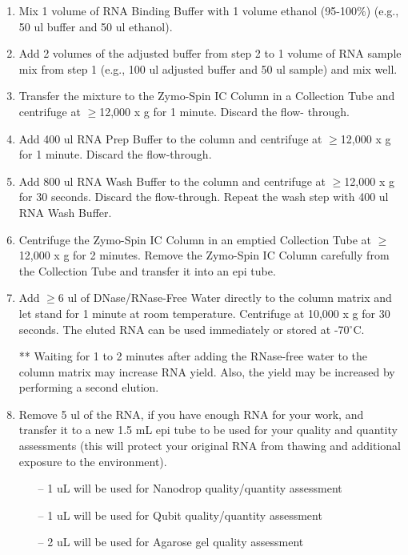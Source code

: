 \documentclass[11pt, oneside]{article}
\begin{document}
\begin{enumerate}
			\item Mix 1 volume of RNA Binding Buffer with 1 volume ethanol (95-100\%) (e.g., 50 ul buffer and 50 ul ethanol).
			\item Add 2 volumes of the adjusted buffer from step 2 to 1 volume of RNA sample mix from step 1 (e.g., 100 ul adjusted buffer and 50 ul 				sample) and mix well.
			\item Transfer the mixture to the Zymo-Spin IC Column in a Collection Tube and centrifuge at $\geq$12,000 x g for 1 minute. Discard the flow-			through.
			\item Add 400 ul RNA Prep Buffer to the column and centrifuge at $\geq$12,000 x g for 1 minute. Discard the flow-through.
			\item Add 800 ul RNA Wash Buffer to the column and centrifuge at $\geq$12,000 x g for 30 seconds. Discard the flow-through. Repeat the 			wash step with 400 ul RNA Wash Buffer.
			\item Centrifuge the Zymo-Spin IC Column in an emptied Collection Tube at $\geq$12,000 x g for 2 minutes. Remove the Zymo-Spin IC 					Column carefully from the Collection Tube and transfer it into an epi tube.
			\item Add $\geq$6 ul of DNase/RNase-Free Water directly to the column matrix and let stand for 1 minute at room temperature. Centrifuge at 				10,000 x g for 30 seconds. The eluted RNA can be used immediately or stored at -70$^{\circ}$C. 
				\begin{adjustwidth}{0.75in}{0pt}** Waiting for 1 to 2 minutes after adding the RNase-free water to the column matrix may increase RNA 				yield. Also, the yield may be increased by performing a second elution.
				\end{adjustwidth}
			\item Remove 5 ul of the RNA, if you have enough RNA for your work, and transfer it to a new 1.5 mL epi tube to be used for your quality and 			quantity assessments (this will protect your original RNA from thawing and additional exposure to the environment). 
				\begin{itemize}	
					\item[--] 1 uL will be used for Nanodrop quality/quantity assessment
					\item[--] 1 uL will be used for Qubit quality/quantity assessment
					\item[--] 2 uL will be used for Agarose gel quality assessment
				\end{itemize}
		\end{enumerate}
			
\end{document}
